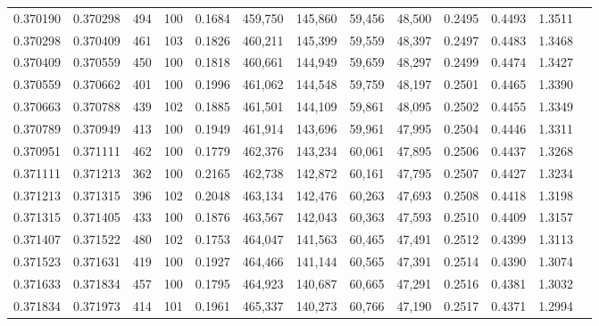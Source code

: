 \begin{tabular}{rrrrrrrrrrrrr}
0.370190 & 0.370298 &   494 & 100 &                                     0.1684 & 459,750 & 145,860 &  59,456 &  48,500 & 0.2495 & 0.4493 & 1.3511 \\
0.370298 & 0.370409 &   461 & 103 &                                     0.1826 & 460,211 & 145,399 &  59,559 &  48,397 & 0.2497 & 0.4483 & 1.3468 \\
0.370409 & 0.370559 &   450 & 100 &                                     0.1818 & 460,661 & 144,949 &  59,659 &  48,297 & 0.2499 & 0.4474 & 1.3427 \\
0.370559 & 0.370662 &   401 & 100 &                                     0.1996 & 461,062 & 144,548 &  59,759 &  48,197 & 0.2501 & 0.4465 & 1.3390 \\
0.370663 & 0.370788 &   439 & 102 &                                     0.1885 & 461,501 & 144,109 &  59,861 &  48,095 & 0.2502 & 0.4455 & 1.3349 \\
0.370789 & 0.370949 &   413 & 100 &                                     0.1949 & 461,914 & 143,696 &  59,961 &  47,995 & 0.2504 & 0.4446 & 1.3311 \\
0.370951 & 0.371111 &   462 & 100 &                                     0.1779 & 462,376 & 143,234 &  60,061 &  47,895 & 0.2506 & 0.4437 & 1.3268 \\
0.371111 & 0.371213 &   362 & 100 &                                     0.2165 & 462,738 & 142,872 &  60,161 &  47,795 & 0.2507 & 0.4427 & 1.3234 \\
0.371213 & 0.371315 &   396 & 102 &                                     0.2048 & 463,134 & 142,476 &  60,263 &  47,693 & 0.2508 & 0.4418 & 1.3198 \\
0.371315 & 0.371405 &   433 & 100 &                                     0.1876 & 463,567 & 142,043 &  60,363 &  47,593 & 0.2510 & 0.4409 & 1.3157 \\
0.371407 & 0.371522 &   480 & 102 &                                     0.1753 & 464,047 & 141,563 &  60,465 &  47,491 & 0.2512 & 0.4399 & 1.3113 \\
0.371523 & 0.371631 &   419 & 100 &                                     0.1927 & 464,466 & 141,144 &  60,565 &  47,391 & 0.2514 & 0.4390 & 1.3074 \\
0.371633 & 0.371834 &   457 & 100 &                                     0.1795 & 464,923 & 140,687 &  60,665 &  47,291 & 0.2516 & 0.4381 & 1.3032 \\
0.371834 & 0.371973 &   414 & 101 &                                     0.1961 & 465,337 & 140,273 &  60,766 &  47,190 & 0.2517 & 0.4371 & 1.2994 \\

\end{tabular}
